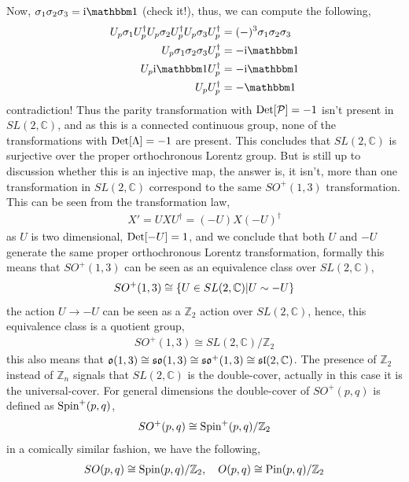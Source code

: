 Now, $\sigma_1\sigma_2\sigma_3 = \im\mathbbm 1$ (check it!), thus, we can compute the following,
\begin{align}
    U_p\sigma_1U^\dagger_pU_p\sigma_2U^\dagger_pU_p\sigma_3U^\dagger_p&=(-)^3\sigma_1\sigma_2\sigma_3\\
    U_p\sigma_1\sigma_2\sigma_3U^\dagger_p&=-\im\mathbbm 1\\
    U_p\im \mathbbm 1U^\dagger_p&=-\im\mathbbm 1\\
    U_pU^\dagger_p&=-\mathbbm 1
\end{align}
contradiction! Thus the parity transformation with $\textup{Det} [\mathcal P]=-1$ isn't present in $SL(2,\mathbb C)$, and as this is a connected continuous group, 
none of the transformations with $\textup{Det} [\Lambda]=-1$ are present. This concludes that $SL(2,\mathbb C)$ is surjective over the proper orthochronous Lorentz 
group. But is still up to discussion whether this is an injective map, the answer is, it isn't, more than one transformation in $SL(2,\mathbb C)$ correspond 
to the same $SO^+(1,3)$ transformation. This can be seen from the transformation law,
\begin{align}
    X' = UXU^\dagger= (-U)X(-U)^\dagger
\end{align}
as $U$ is two dimensional, $\textup{Det} [-U]=1$, and we conclude that both $U$ and $-U$ generate the same proper orthochronous Lorentz transformation, formally this means 
that $SO^+(1,3)$ can be seen as an equivalence class over $SL(2,\mathbb C)$, 
\begin{align}
    SO^+ (1,3) \cong \qty{U\in SL(2,\mathbb C)| U\sim -U}
\end{align}
the action $U\rightarrow -U$ can be seen as a $\mathbb Z_2$ action over $SL(2,\mathbb C)$, hence, this equivalence class is a quotient group,
\begin{align}
    SO^+ (1,3) \cong  SL(2,\mathbb C)/\mathbb Z_ 2
\end{align}
this also means that $\mathfrak{o} \qty(1,3)\cong \mathfrak{so} \qty(1,3)\cong\mathfrak{so}^+ \qty(1,3) \cong \mathfrak {sl}(2,\mathbb C)$. The presence 
of $\mathbb Z_ 2$ instead of $\mathbb Z_n$ signals that $SL(2,\mathbb C)$ is the double-cover, actually in this case it is the universal-cover. For general 
dimensions the double-cover of $SO^+(p,q)$ is defined as $\textnormal{Spin}^+(p,q)$,
\begin{align}
    SO^+ (p,q) \cong  \textnormal{Spin}^+(p,q)/\mathbb Z_ 2
\end{align}
in a comically similar fashion, we have the following,
\begin{align}
    SO (p,q) \cong  \textnormal{Spin}(p,q)/\mathbb Z_ 2,\ \ \ O (p,q) \cong  \textnormal{Pin}(p,q)/\mathbb Z_ 2
\end{align}
